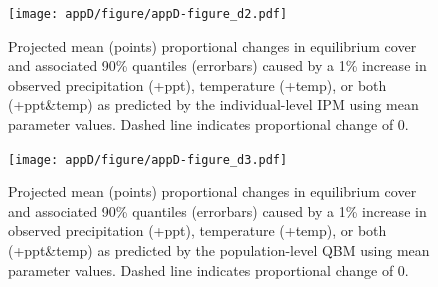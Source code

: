 \documentclass[12pt,]{article}
\begin{document}
\begin{figure}[htbp]
\centering
\texttt{[image: appD/figure/appD-figure\_d2.pdf]}
\caption{Projected mean (points) proportional changes in equilibrium
cover and associated 90\% quantiles (errorbars) caused by a 1\% increase
in observed precipitation (+ppt), temperature (+temp), or both
(+ppt\&temp) as predicted by the individual-level IPM using mean
parameter values. Dashed line indicates proportional change of 0.}
\end{figure}

\begin{figure}[htbp]
\centering
\texttt{[image: appD/figure/appD-figure\_d3.pdf]}
\caption{Projected mean (points) proportional changes in equilibrium
cover and associated 90\% quantiles (errorbars) caused by a 1\% increase
in observed precipitation (+ppt), temperature (+temp), or both
(+ppt\&temp) as predicted by the population-level QBM using mean
parameter values. Dashed line indicates proportional change of 0.}
\end{figure}
\end{document}
